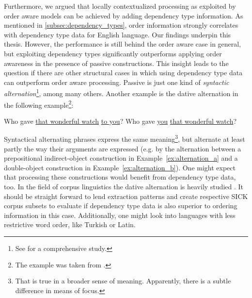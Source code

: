 Furthermore, we argued that locally contextualized processing as exploited by order aware models can be achieved by adding dependency type information. As mentioned in \ref{subsec:dependency_types}, order information strongly correlates with dependency type data for English language. Our findings underpin this thesis. However, the performance is still behind the order aware case in general, but exploiting dependency types significantly outperforms applying order awareness in the presence of passive constructions. This insight leads to the question if there are other structural cases in which using dependency type data can outperform order aware processing. Passive is just one kind of \textit{syntactic alternation}\footnote{See \autocite{levin_english_1993} for a comprehensive study.}, among many others. Another example is the dative alternation in the following example\footnote{The example was taken from \autocite{kendall_dative_2011}.}:
\begin{exe}
	\ex \label{ex:alternation} 
	\begin{xlist}	
		\ex \label{ex:alternation_a} Who gave \underline{that wonderful watch} \underline{to you}?
		\ex \label{ex:alternation_b} Who gave \underline{you} \underline{that wonderful watch}?
	\end{xlist}
\end{exe}
Syntactical alternating phrases express the same meaning\footnote{That is true in a broader sense of meaning. Apparently, there is a subtle difference in means of focus.}, but alternate at least partly the way their arguments are expressed (e.g. by the alternation between a prepositional indirect-object construction in Example~\ref{ex:alternation_a} and a double-object construction in Example~\ref{ex:alternation_b}). One might expect that processing these constructions would benefit from dependency type data, too. In the field of corpus linguistics the dative alternation is heavily studied \autocite{lapata_acquiring_1999,bresnan_gradience_2003,bresnan2007predicting,kendall_dative_2011}. It should be straight forward to lend extraction patterns and create respective SICK corpus subsets to evaluate if dependency type data is also superior to ordering information in this case. Additionally, one might look into languages with less restrictive word order, like Turkish or Latin.

